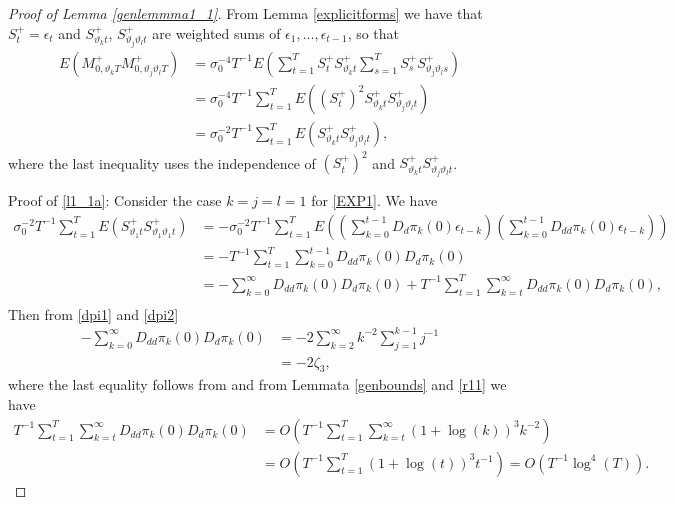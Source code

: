 {{\begin{lemma}
\end{lemma}
\begin{proof}[Proof of Lemma \ref{genlemmma1_1}]
From Lemma \ref{explicitforms} we have that  $S^+_{t} = \epsilon_t$ and $ S^+_{\vartheta_k t}$, $S^+_{\vartheta_j \vartheta_l t}$ are weighted sums of $\epsilon_{1},\ldots,\epsilon_{t-1}$, so that  
\begin{align}
      E\left(  M^+_{0,\vartheta_k  T}  M^+_{0,\vartheta_j \vartheta_l   T} \right) &= 
      \sigma_0^{-4} T^{-1} E \left( \sum_{t = 1}^T  S^+_{t} S^+_{\vartheta_k t} \sum_{s = 1}^T S^+_{s} S^+_{\vartheta_j \vartheta_l  s} \right) \nonumber\\ 
      &=  \sigma_0^{-4} T^{-1}  \sum_{t = 1}^T E \left( \left(S^+_{t} \right)^2  S^+_{\vartheta_k t} S^+_{\vartheta_j \vartheta_l  t} \right) \nonumber \\
      &= \sigma_0^{-2} T^{-1}  \sum_{t = 1}^T E \left( S^+_{\vartheta_k t}   S^+_{\vartheta_j \vartheta_l  t} \right), \label{EXP1} 
\end{align}
where the last inequality uses the independence of $\left(S^+_{t} \right)^2$ and $S^+_{\vartheta_k t} S^+_{\vartheta_j \vartheta_l  t}$. 

Proof of \eqref{l1_1a}: Consider the case $k=j=l = 1$ for \eqref{EXP1}. We have 
\begin{align*}
      \sigma_0^{-2} T^{-1} \sum_{t = 1}^T  E \left( S_{\vartheta_1 t}^+ S_{\vartheta_1 \vartheta_1 t}^+  \right) &=  -  \sigma_0^{-2} T^{-1} \sum_{t = 1}^T  E \left( \left( \sum_{k = 0}^{t-1} D_d \pi_{k}(0) \epsilon_{t-k} \right) \left( \sum_{k = 0}^{t-1} D_{dd} \pi_{k}(0) \epsilon_{t-k} \right) \right) \\
     &= - T^{-1} \sum_{t = 1}^T \sum_{k = 0}^{t-1} D_{dd} \pi_{k}(0)  D_d \pi_{k}(0) \\
     &= -  \sum_{k = 0}^{\infty} D_{dd} \pi_{k}(0)  D_d \pi_{k}(0) + T^{-1} \sum_{t = 1}^T \sum_{k = t}^{\infty} D_{dd} \pi_{k}(0)  D_d \pi_{k}(0), \\
\end{align*}
Then from \eqref{dpi1} and \eqref{dpi2}
\begin{align*}
    - \sum_{k = 0}^{\infty} D_{dd} \pi_{k}(0)  D_d \pi_{k}(0) &= -2 \sum_{ k = 2}^{\infty} k^{-2} \sum_{j = 1}^{k-1} j^{-1} \\
    &= -2 \zeta_3,
\end{align*}
where the last equality follows from \textcite[Lemma B.2]{johansen2016role}
and from Lemmata \ref{genbounds}  and \ref{r11} we have  
\begin{align*}
     T^{-1} \sum_{t = 1}^T \sum_{k = t}^{\infty} D_{dd} \pi_{k}(0)  D_d \pi_{k}(0) &=  O(T^{-1} \sum_{t = 1}^T \sum_{k = t}^{\infty} (1+\log(k))^3 k^{-2} ) \\
     &=  O(T^{-1} \sum_{t = 1}^T (1+\log(t))^3 t^{-1} ) =  O(T^{-1} \log^4(T) ).
\end{align*}


\end{proof}}}
